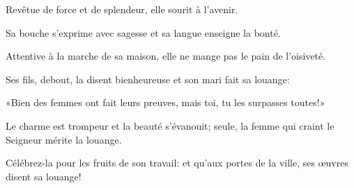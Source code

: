 
Revêtue de force et de splendeur, elle sourit à l’avenir.

Sa bouche s’exprime avec sagesse et sa langue enseigne la bonté.

Attentive à la marche de sa maison, elle ne mange pas le pain de l’oisiveté.

Ses fils, debout, la disent bienheureuse et son mari fait sa louange:

«Bien des femmes ont fait leurs preuves, mais toi, tu les surpasses toutes!»

Le charme est trompeur et la beauté s’évanouit; seule, la femme qui craint le Seigneur mérite la louange.

Célébrez-la pour les fruits de son travail: et qu’aux portes de la ville, ses œuvres disent sa louange!